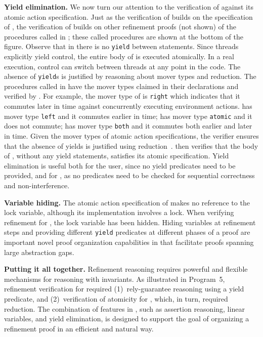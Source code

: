 {\bf Yield elimination.} 
We now turn our attention to the verification of  against
its atomic action specification.
Just as the verification of  builds on the specification of ,
the verification of  builds on other refinement proofs (not shown) 
of the procedures called in ;
these called procedures are shown at the bottom of the figure. 
Observe that in  there is no {\tt yield} between
statements. Since threads explicitly yield control, the
entire body of  is executed atomically. In
a real execution, control can switch between threads at any point in
the code. The absence of {\tt yield}s is justified by reasoning about
mover types and reduction. The procedures called in
 have the mover types claimed in their
declarations and verified by \civl. 
For example, the mover type of  is {\tt right} which indicates 
that it commutes later in time against concurrently executing environment actions.
 has mover type {\tt left} and it commutes earlier in time;
 has mover type {\tt atomic} and it does not commute;
 has mover type {\tt both} and it commutes both earlier and later in time.
Given the mover types of 
atomic action specifications, the \civl verifier ensures
that the absence of yields is justified using reduction~\cite{Lipton75}.  
\civl then verifies that the body of , without any yield statements, satisfies
its atomic specification. Yield elimination is useful both for the
user, since no yield predicates need to be provided, and for \civl,
as no predicates need to be checked for sequential correctness and
non-interference.

{\bf Variable hiding.} The atomic action specification of 
makes no reference to the lock variable, although its implementation
involves a lock. When verifying refinement for , the lock
variable has been hidden. Hiding variables at refinement steps and
providing different {\tt yield} predicates at different phases of a
proof are important novel proof organization capabilities in \civl
that facilitate proofs spanning large abstraction gaps.

{\bf Putting it all together.} 
Refinement reasoning requires powerful and
flexible mechanisms for reasoning with invariants.  
As illustrated in Program~5, refinement verification for  required 
(1)~rely-guarantee reasoning using a yield predicate, and 
(2)~verification of atomicity for , which, in turn, required reduction. 
The combination of features in \civl, such as assertion reasoning, linear variables, and yield elimination,
is designed to support the goal of organizing a
refinement proof in an efficient and natural way.

